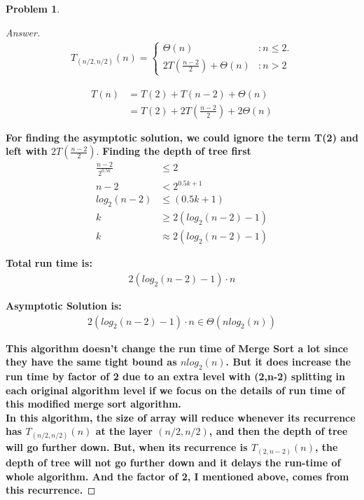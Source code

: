 \documentclass[11pt]{article}
\theoremstyle{definition}
\theoremstyle{definition}
\newtheorem{required}{Problem}
\theoremstyle{definition}
\begin{document}
\begin{required}
\begin{enumerate}[label=(\alph*)]
\begin{proof}[Answer]
\begin{align*}
T_{(n/2,n/2)}(n) = \begin{cases}
\Theta(n)& : n \leq 2.\\
2T(\frac{n-2}{2}) + \Theta(n) & : n > 2 
\end{cases}
\end{align*}

\begin{align*}
T(n) &= T(2) + T(n-2) + \Theta(n)\\
&= T(2) + 2T(\frac{n-2}{2}) +2\Theta(n)
\end{align*}

\textbf{For finding the asymptotic solution, we could ignore the term T(2) and left with $2T(\frac{n-2}{2}).$}
\textbf{Finding the depth of tree first}
\begin{align*}
\frac{n-2}{2^{0.5k}} & \leq 2\\
n-2 &< 2^{0.5k+1}\\
log_2\left(n-2\right) &\leq (0.5k+1)\\
k &\geq 2 (log_2\left(n-2\right)-1)\\
k &\approx   2 (log_2\left(n-2\right)-1)
\end{align*}

\textbf{Total run time is:\\}
\begin{align*}
2 (log_2\left(n-2\right)-1) \cdot n
\end{align*}

\textbf{Asymptotic Solution is:\\}
\begin{align*}
2 (log_2\left(n-2\right)-1) \cdot n \in  \Theta(nlog_2(n))
\end{align*}

\textbf{This algorithm doesn't change the run time of Merge Sort a lot since they have the same tight bound as $nlog_2(n)$. But it does increase the run time by factor of 2 due to an extra level with (2,n-2) splitting in each original algorithm level if we focus on the details of run time of this modified merge sort algorithm.\\}
\textbf{In this algorithm, the size of array will reduce whenever its recurrence has $T_{(n/2,n/2)}(n)$  at the layer $(n/2,n/2)$, and then the depth of tree will go further down. But, when its recurrence is $T_{(2,n-2)}(n)$, the depth of tree will not go further down and it delays the run-time of whole algorithm. And the factor of 2, I mentioned above, comes from this recurrence. }
\end{proof}

\end{enumerate}
\end{required}
\end{document}
